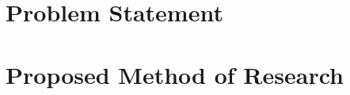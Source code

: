 \documentclass[11pt]{article}
\begin{document}
\section{Problem Statement}



\cite{Arnold2013EI}


\section{Proposed Method of Research}
\end{document}
